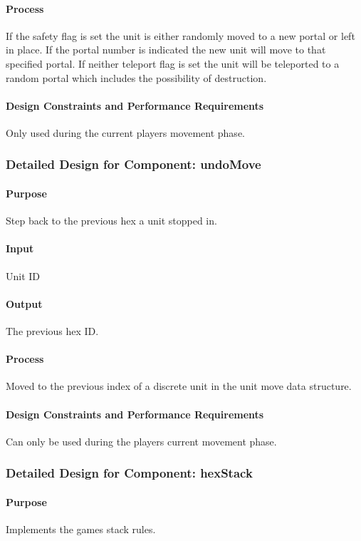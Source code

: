 \documentclass[12pt,a4paper,titlepage]{article}
\begin{document}
\paragraph{Process} If the safety flag is set the unit is either randomly moved to a new portal or left in place. If the portal number is indicated the new unit will move to that specified portal. If neither teleport flag is set the unit will be teleported to a random portal which includes the possibility of destruction.
\paragraph{Design Constraints and Performance Requirements} Only used during the current players movement phase.

\subsubsection{Detailed Design for Component: undoMove}
\paragraph{Purpose} Step back to the previous hex a unit stopped in.
\paragraph{Input} Unit ID
\paragraph{Output} The previous hex ID.
\paragraph{Process} Moved to the previous index of a discrete unit in the unit move data structure. 
\paragraph{Design Constraints and Performance Requirements} Can only be used during the players current movement phase.

\subsubsection{Detailed Design for Component: hexStack}
\paragraph{Purpose} Implements the games stack rules.
\end{document}

